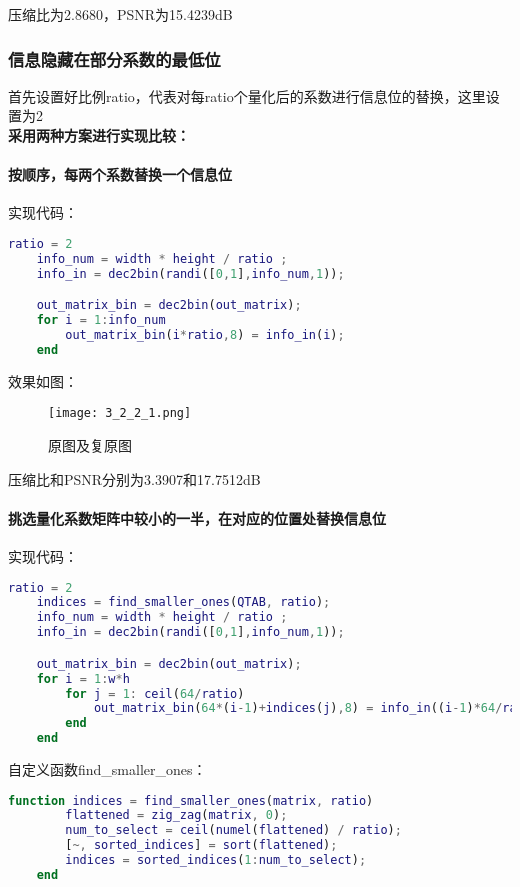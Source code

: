 \documentclass[12pt]{article}
\newcommand{\subsubsubsection}[1]{\paragraph{#1}\mbox{}}
\begin{document}
压缩比为2.8680，PSNR为15.4239dB

\subsubsection{信息隐藏在部分系数的最低位}

首先设置好比例ratio，代表对每ratio个量化后的系数进行信息位的替换，这里设置为2\\
\hspace*{2em}\textbf{采用两种方案进行实现比较：}
\subsubsubsection{按顺序，每两个系数替换一个信息位}

\hspace*{2em}实现代码：
\begin{lstlisting}[language=matlab]
    ratio = 2
    info_num = width * height / ratio ;
    info_in = dec2bin(randi([0,1],info_num,1));

    out_matrix_bin = dec2bin(out_matrix);
    for i = 1:info_num
        out_matrix_bin(i*ratio,8) = info_in(i);
    end
\end{lstlisting}

效果如图：
\begin{figure}[H]
    \centering
    \texttt{[image: 3\_2\_2\_1.png]}
    \caption{原图及复原图}
\end{figure}

压缩比和PSNR分别为3.3907和17.7512dB\\
\subsubsubsection{挑选量化系数矩阵中较小的一半，在对应的位置处替换信息位}

实现代码：
\begin{lstlisting}[language=matlab]
    ratio = 2
    indices = find_smaller_ones(QTAB, ratio);
    info_num = width * height / ratio ;
    info_in = dec2bin(randi([0,1],info_num,1));

    out_matrix_bin = dec2bin(out_matrix);
    for i = 1:w*h
        for j = 1: ceil(64/ratio)
            out_matrix_bin(64*(i-1)+indices(j),8) = info_in((i-1)*64/ratio+j);
        end
    end
\end{lstlisting}

自定义函数find\_smaller\_ones：
\begin{lstlisting}[language=matlab]
    function indices = find_smaller_ones(matrix, ratio)
        flattened = zig_zag(matrix, 0);
        num_to_select = ceil(numel(flattened) / ratio);
        [~, sorted_indices] = sort(flattened);
        indices = sorted_indices(1:num_to_select);
    end
\end{lstlisting}
\end{document}
